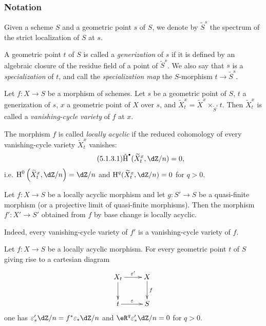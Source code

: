 \subsubsection{Notation}\label{I:5-1-1}

Given a scheme $S$ and a geometric point $s$ of $S$, we denote by
$\widetilde S^s$ the spectrum of the strict localization of $S$ at $s$.

\begin{definition}\label{I:5-1-2}
A geometric point $t$ of $S$ is called a \emph{generization} of $s$ if
it is defined by an algebraic closure of the residue field of a point of
$\widetilde S^s$. We also say that $s$ is a \emph{specialization} of
$t$, and call the \emph{specialization map} the $S$-morphism
$t\to\widetilde S^s$.
\end{definition}

\begin{definition}\label{I:5-1-3}
Let $f:X\to S$ be a morphism of schemes. Let $s$ be a geometric point
of $S$, $t$ a generization of $s$, $x$ a geometric point of $X$ over
$s$, and
$\widetilde X_t^x=\widetilde X^x\times_{\widetilde S^s}t$. Then
$\widetilde X_t^x$ is called a \emph{vanishing-cycle variety} of $f$ at
$x$.

The morphism $f$ is called \emph{locally acyclic} if the reduced
cohomology of every vanishing-cycle variety $\widetilde X_t^x$ vanishes:
\begin{equation*}\tag{5.1.3.1}\label{I:eq:5-1-3-1}
  \hat\h^\bullet(\widetilde X_t^x,\dZ/n) = 0\text{,}
\end{equation*}
i.e. $\h^0\left(\widetilde X_t^x,\dZ/n\right)=\dZ/n$ and
$\h^q(\widetilde X_t^x,\dZ/n)=0$ for $q>0$.
\end{definition}

\begin{lemma}\label{I:5-1-4}
Let $f:X\to S$ be a locally acyclic morphism and let $g:S'\to S$ be a
quasi-finite morphism (or a projective limit of quasi-finite morphisms).
Then the morphism $f':X'\to S'$ obtained from $f$ by base change is
locally acyclic.
\end{lemma}

Indeed, every vanishing-cycle variety of $f'$ is a vanishing-cycle
variety of $f$.

\begin{lemma}\label{I:5-1-5}
Let $f:X\to S$ be a locally acyclic morphism. For every geometric point
$t$ of $S$ giving rise to a cartesian diagram
\[\xymatrix{
  X_t \ar[r]^-{\varepsilon'} \ar[d]
    & X \ar[d]^-f \\
  t \ar[r]^-\varepsilon
    & S
}\]
one has $\varepsilon_*'\dZ/n=f^*\varepsilon_*\dZ/n$ and
$\eR^q\varepsilon_*'\dZ/n=0$ for $q>0$.
\end{lemma}

